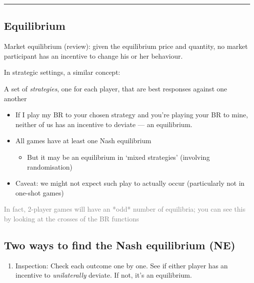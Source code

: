 \documentclass[]{article}
\providecommand{\tightlist}{%
  \setlength{\itemsep}{0pt}\setlength{\parskip}{0pt}}
\begin{document}
\begin{center}\rule{0.5\linewidth}{\linethickness}\end{center}

\hypertarget{equilibrium}{%
\subsection{Equilibrium}\label{equilibrium}}

Market equilibrium (review): given the equilibrium price and quantity,
no market participant has an incentive to change his or her behaviour.

\bigskip

In strategic settings, a similar concept:

\begin{description}
\tightlist
\item[Nash equilibrium (NE)]
A set of \emph{strategies}, one for each player, that are best responses
against one another
\end{description}

\begin{itemize}
\item
  If I play my BR to your chosen strategy and you're playing your BR to
  mine, neither of us has an incentive to deviate --- an equilibrium.
\item
  All games have at least one Nash equilibrium

  \begin{itemize}
  \tightlist
  \item
    But it may be an equilibrium in `mixed strategies' (involving
    randomisation)
  \end{itemize}
\item
  Caveat: we might not expect such play to actually occur (particularly
  not in one-shot games)
\end{itemize}

\textcolor{gray}{In fact, 2-player games will have an *odd* number of equilibria; you can see this by looking at the crosses of the BR functions}

\hypertarget{two-ways-to-find-the-nash-equilibrium-ne}{%
\subsection{Two ways to find the Nash equilibrium
(NE)}\label{two-ways-to-find-the-nash-equilibrium-ne}}

\begin{enumerate}
\def\labelenumi{\arabic{enumi}.}
\tightlist
\item
  Inspection: Check each outcome one by one. See if either player has an
  incentive to \emph{unilaterally} deviate. If not, it's an equilibrium.
\end{enumerate}
\end{document}
